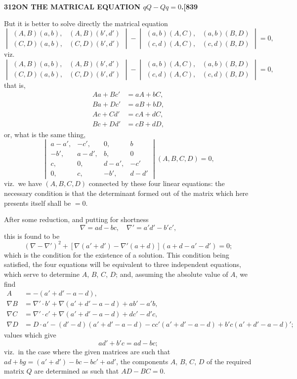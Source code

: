 \documentclass[12pt,a4paper]{article}
\theoremstyle{definition}
\begin{document}
\newpage
\setcounter{page}{312}

\noindent\textbf{312}\hfill\textbf{ON THE MATRICAL EQUATION $qQ - Qq = 0$.}\hfill\textbf{[839}

\bigskip

\noindent But it is better to solve directly the matrical equation
\[
\begin{vmatrix} (A, B)(a, b), & (A, B)(b', d') \\ (C, D)(a, b), & (C, D)(b', d') \end{vmatrix} - \begin{vmatrix} (a, b)(A, C), & (a, b)(B, D) \\ (c, d)(A, C), & (c, d)(B, D) \end{vmatrix} = 0,
\]
viz.\
\[
\begin{vmatrix} (A, B)(a, b), & (A, B)(b', d') \\ (C, D)(a, b), & (C, D)(b', d') \end{vmatrix} - \begin{vmatrix} (a, b)(A, C), & (a, b)(B, D) \\ (c, d)(A, C), & (c, d)(B, D) \end{vmatrix} = 0,
\]
that is,
\begin{align*}
Aa + Bc' &= aA + bC, \\
Ba + Dc' &= aB + bD, \\
Ac + Cd' &= cA + dC, \\
Bc + Dd' &= cB + dD,
\end{align*}
or, what is the same thing,
\[
\begin{vmatrix} a - a', & -c', & 0, & b \\ -b', & a - d', & b, & 0 \\ c, & 0, & d - a', & -c' \\ 0, & c, & -b', & d - d' \end{vmatrix} (A, B, C, D) = 0,
\]
viz.\ we have $(A, B, C, D)$ connected by these four linear equations: the necessary condition is that the determinant formed out of the matrix which here presents itself shall be $= 0$.

After some reduction, and putting for shortness
\[
\nabla = ad - bc, \quad \nabla' = a'd' - b'c',
\]
this is found to be
\[
(\nabla - \nabla')^2 + [\nabla(a' + d') - \nabla'(a + d)](a + d - a' - d') = 0;
\]
which is the condition for the existence of a solution. This condition being satisfied, the four equations will be equivalent to three independent equations, which serve to determine $A$, $B$, $C$, $D$; and, assuming the absolute value of $A$, we find
\begin{align*}
A &= -(a' + d' - a - d), \\
\nabla B &= \nabla' \cdot b' + \nabla(a' + d' - a - d) + ab' - a'b, \\
\nabla C &= \nabla' \cdot c' + \nabla(a' + d' - a - d) + dc' - d'c, \\
\nabla D &= D \cdot a' - (d' - d)(a' + d' - a - d) - cc'(a' + d' - a - d) + b'c(a' + d' - a - d)';
\end{align*}
values which give
\[
ad' + b'c = ad - bc;
\]
viz.\ in the case where the given matrices are such that $ad + bg = (a' + d') - bc - bc' + ad'$, the components $A$, $B$, $C$, $D$ of the required matrix $Q$ are determined as such that $AD - BC = 0$.
\end{document}

